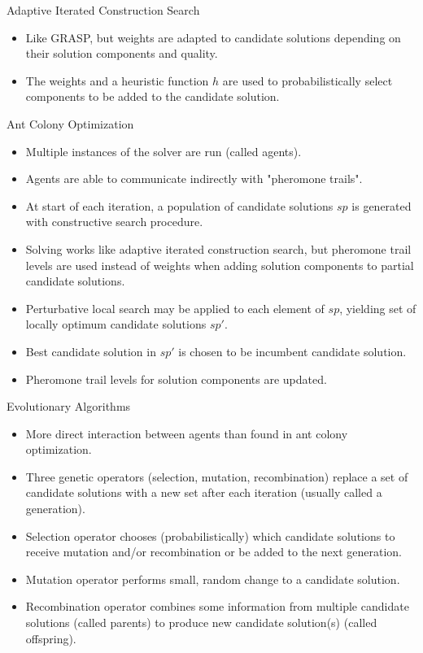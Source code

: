 \documentclass{beamer}
\begin{document}
\begin{frame}{Adaptive Iterated Construction Search}
\begin{itemize}
    \item Like GRASP, but weights are adapted to candidate solutions depending on their solution components and quality.
    \item The weights and a heuristic function $h$ are used to probabilistically select components to be added to the candidate solution.
\end{itemize}
\end{frame}

\begin{frame}{Ant Colony Optimization}
\begin{itemize}
    \item Multiple instances of the solver are run (called agents).
    \item Agents are able to communicate indirectly with "pheromone trails".
    \item At start of each iteration, a population of candidate solutions $sp$ is generated with constructive search procedure.
    \item Solving works like adaptive iterated construction search, but pheromone trail levels are used instead of weights when adding solution components to partial candidate solutions.
    \item Perturbative local search may be applied to each element of $sp$, yielding set of locally optimum candidate solutions $sp'$.
    \item Best candidate solution in $sp'$ is chosen to be incumbent candidate solution.
    \item Pheromone trail levels for solution components are updated.
\end{itemize}
\end{frame}

\begin{frame}{Evolutionary Algorithms}
\begin{itemize}
    \item More direct interaction between agents than found in ant colony optimization.
    \item Three genetic operators (selection, mutation, recombination) replace a set of candidate solutions with a new set after each iteration (usually called a generation).
    \item Selection operator chooses (probabilistically) which candidate solutions to receive mutation and/or recombination or be added to the next generation.
    \item Mutation operator performs small, random change to a candidate solution.
    \item Recombination operator combines some information from multiple candidate solutions (called parents) to produce new candidate solution(s) (called offspring).
\end{itemize}
\end{frame}
\end{document}
